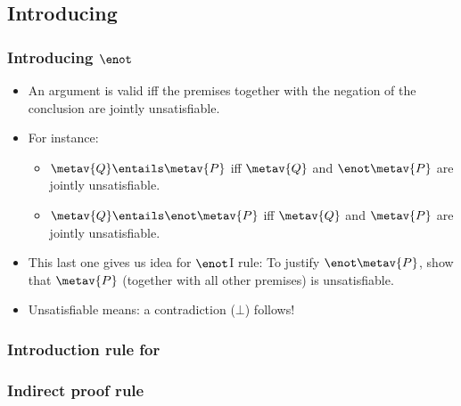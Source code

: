 \subsection{Introducing \enot}

\begin{frame}
  \frametitle{Introducing $\enot$}

  \begin{itemize}[<+->]
    \item An argument is valid iff the premises
    together with the negation of the conclusion are jointly
    unsatisfiable.
    \item For instance:
    \begin{itemize}[<+->]
      \item $\metav{Q} \entails \metav{P}$ iff
      $\metav{Q}$ and $\enot\metav{P}$ are jointly unsatisfiable.
      \item $\metav{Q} \entails \enot\metav{P}$ iff
      $\metav{Q}$ and $\metav{P}$ are jointly unsatisfiable.
    \end{itemize}
    \item This last one gives us idea for $\enot$I rule: To justify
    $\enot\metav{P}$, show that $\metav{P}$ (together with all other
    premises) is unsatisfiable.
    \item Unsatisfiable means: a contradiction ($\bot$) follows!
  \end{itemize}
\end{frame}

\begin{frame}
  \frametitle{Introduction rule for \enot}
  \begin{fitchproof}
    \open
    \ellipsesline
    \close
     
  \end{fitchproof}
\end{frame}

\begin{frame}
  \begin{fitchproof}
    \open
    \open
    \open
    \close
    \close
    \close
  \end{fitchproof}
\end{frame}

\begin{frame}
  \frametitle{Indirect proof rule}
  \begin{fitchproof}
    \open
    \ellipsesline
    \close
     
  \end{fitchproof}
\end{frame}

